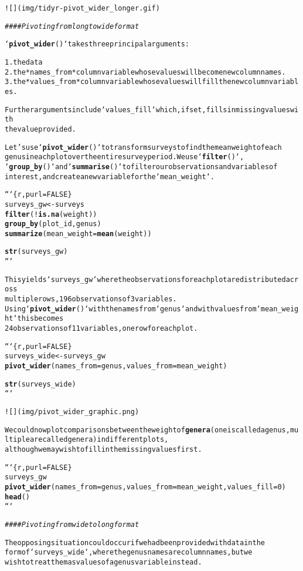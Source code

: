\documentclass{article}\usepackage[]{graphicx}\usepackage[]{xcolor}
\makeatletter
\newcommand{\hlcom}[1]{\textcolor[rgb]{0.678,0.584,0.686}{\textit{#1}}}%
\newcommand{\hlkwd}[1]{\textcolor[rgb]{0.737,0.353,0.396}{\textbf{#1}}}%
\newenvironment{kframe}{%
 \def\at@end@of@kframe{}%
 \ifinner\ifhmode%
  \def\at@end@of@kframe{\end{minipage}}%
  \begin{minipage}{\columnwidth}%
 \fi\fi%
 \def\FrameCommand##1{\hskip\@totalleftmargin \hskip-\fboxsep
 \colorbox{shadecolor}{##1}\hskip-\fboxsep
     \hskip-\linewidth \hskip-\@totalleftmargin \hskip\columnwidth}%
 \MakeFramed {\advance\hsize-\width
   \@totalleftmargin\z@ \linewidth\hsize
   \@setminipage}}%
 {\par\unskip\endMakeFramed%
 \at@end@of@kframe}
\newenvironment{knitrout}{}{} %
\makeatother
\begin{document}
\begin{knitrout}
\begin{kframe}
\begin{alltt}
![](img/tidyr-pivot_wider_longer.gif)

\hlcom{#### Pivoting from long to wide format}

`\hlkwd{pivot_wider}()` takes three principal arguments:

1. the data
2. the *names_from* column variable whose values will become new column names.  
3. the *values_from* column variable whose values will fill the new column variables.

Further arguments include `values_fill` which, if set, fills in missing values with
the value provided.

Let's use `\hlkwd{pivot_wider}()` to transform surveys to find the mean weight of each
genus in each plot over the entire survey period. We use `\hlkwd{filter}()`,
`\hlkwd{group_by}()` and `\hlkwd{summarise}()` to filter our observations and variables of
interest, and create a new variable for the `mean_weight`.

```\{r, purl=FALSE\}
surveys_gw <- surveys %>%
  \hlkwd{filter}(!\hlkwd{is.na}(weight)) %>%
  \hlkwd{group_by}(plot_id, genus) %>%
  \hlkwd{summarize}(mean_weight = \hlkwd{mean}(weight))

\hlkwd{str}(surveys_gw)
```

This yields `surveys_gw` where the observations for each plot are distributed across
multiple rows, 196 observations of 3 variables.
Using `\hlkwd{pivot_wider}()` with the names from `genus` and with values from `mean_weight` this becomes
24 observations of 11 variables, one row for each plot.

```\{r, purl=FALSE\}
surveys_wide <- surveys_gw %>%
  \hlkwd{pivot_wider}(names_from = genus, values_from = mean_weight)

\hlkwd{str}(surveys_wide)
```

![](img/pivot_wider_graphic.png)

We could now plot comparisons between the weight of \hlkwd{genera} (one is called a genus, multiple are called genera) in different plots,
although we may wish to fill in the missing values first.

```\{r, purl=FALSE\}
surveys_gw %>%
  \hlkwd{pivot_wider}(names_from = genus, values_from = mean_weight, values_fill = 0) %>%
  \hlkwd{head}()
```

\hlcom{#### Pivoting from wide to long format}

The opposing situation could occur if we had been provided with data in the
form of `surveys_wide`, where the genus names are column names, but we
wish to treat them as values of a genus variable instead.


\end{alltt}
\end{kframe}
\end{knitrout}
\end{document}
